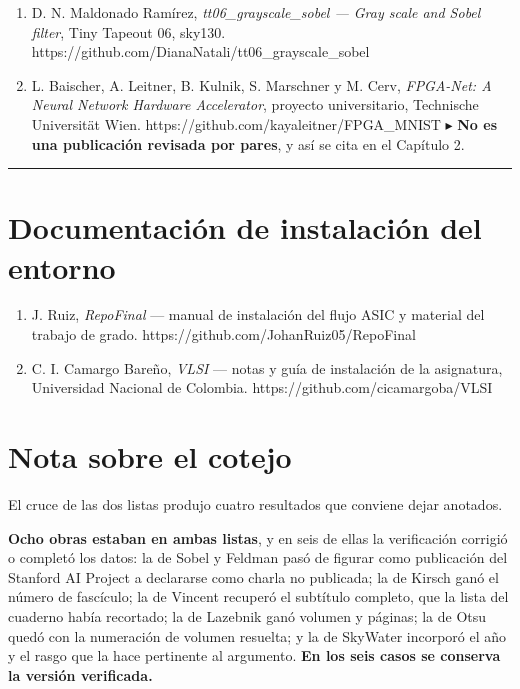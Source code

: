 \begin{enumerate}
\def\labelenumi{\arabic{enumi}.}
\setcounter{enumi}{45}
\tightlist
\item
  D. N. Maldonado Ramírez, \emph{tt06\_grayscale\_sobel --- Gray scale
  and Sobel filter}, Tiny Tapeout 06, sky130.
  https://github.com/DianaNatali/tt06\_grayscale\_sobel
\item
  L. Baischer, A. Leitner, B. Kulnik, S. Marschner y M. Cerv,
  \emph{FPGA-Net: A Neural Network Hardware Accelerator}, proyecto
  universitario, Technische Universität Wien.
  https://github.com/kayaleitner/FPGA\_MNIST ▸ \textbf{No es una
  publicación revisada por pares}, y así se cita en el Capítulo 2.
\end{enumerate}

\begin{center}\rule{0.5\linewidth}{0.5pt}\end{center}

\section{Documentación de instalación del
entorno}\label{documentaciuxf3n-de-instalaciuxf3n-del-entorno}

\begin{enumerate}
\def\labelenumi{\arabic{enumi}.}
\setcounter{enumi}{47}
\tightlist
\item
  J. Ruiz, \emph{RepoFinal} --- manual de instalación del flujo ASIC y
  material del trabajo de grado.
  https://github.com/JohanRuiz05/RepoFinal
\item
  C. I. Camargo Bareño, \emph{VLSI} --- notas y guía de instalación de
  la asignatura, Universidad Nacional de Colombia.
  https://github.com/cicamargoba/VLSI
\end{enumerate}

\section{Nota sobre el cotejo}\label{nota-sobre-el-cotejo}

El cruce de las dos listas produjo cuatro resultados que conviene dejar
anotados.

\textbf{Ocho obras estaban en ambas listas}, y en seis de ellas la
verificación corrigió o completó los datos: la de Sobel y Feldman pasó
de figurar como publicación del Stanford AI Project a declararse como
charla no publicada; la de Kirsch ganó el número de fascículo; la de
Vincent recuperó el subtítulo completo, que la lista del cuaderno había
recortado; la de Lazebnik ganó volumen y páginas; la de Otsu quedó con
la numeración de volumen resuelta; y la de SkyWater incorporó el año y
el rasgo que la hace pertinente al argumento. \textbf{En los seis casos
se conserva la versión verificada.}

